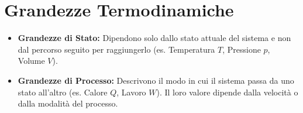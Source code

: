 \section{Grandezze Termodinamiche}
\begin{itemize}
    \item \textbf{Grandezze di Stato:} Dipendono solo dallo stato attuale del sistema e non dal percorso seguito per raggiungerlo (es. Temperatura $T$, Pressione $p$, Volume $V$).
    \item \textbf{Grandezze di Processo:} Descrivono il modo in cui il sistema passa da uno stato all'altro (es. Calore $Q$, Lavoro $W$). Il loro valore dipende dalla velocità o dalla modalità del processo.
\end{itemize}